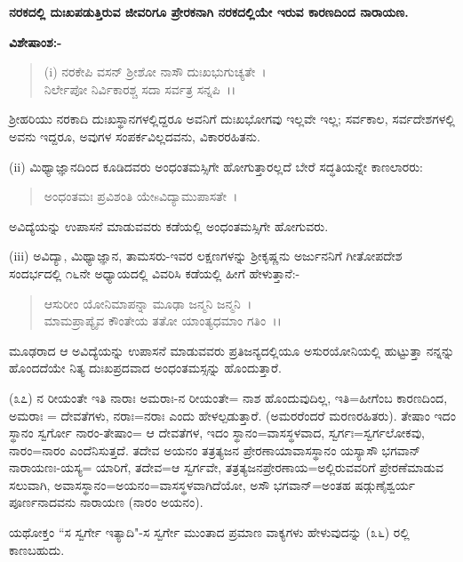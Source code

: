 \begin{center}
\textbf{ನರಕದಲ್ಲಿ ದುಃಖಪಡುತ್ತಿರುವ ಜೀವರಿಗೂ ಪ್ರೇರಕನಾಗಿ ನರಕದಲ್ಲಿಯೇ ಇರುವ ಕಾರಣದಿಂದ ನಾರಾಯಣ.}
\end{center}

\noindent
\textbf{ವಿಶೇಷಾಂಶ:-}

\begin{verse}
(i) ನರಕೇಪಿ ವಸನ್ ಶ‍್ರೀಶೋ ನಾಸೌ ದುಃಖಭುಗುಚ್ಯತೇ~।\\ ನಿರ್ಲೇಪೋ ನಿರ್ವಿಕಾರಶ್ಚ ಸದಾ ಸರ್ವತ್ರ ಸನ್ನಪಿ~।।
\end{verse}


ಶ‍್ರೀಹರಿಯು ನರಕಾದಿ ದುಃಖಸ್ಥಾನಗಳಲ್ಲಿದ್ದರೂ ಅವನಿಗೆ ದುಃಖಭೋಗವು ಇಲ್ಲವೇ ಇಲ್ಲ; ಸರ್ವಕಾಲ, ಸರ್ವದೇಶಗಳಲ್ಲಿ ಅವನು ಇದ್ದರೂ, ಅವುಗಳ ಸಂಪರ್ಕವಿಲ್ಲದವನು, ವಿಕಾರರಹಿತನು.

(ii) ಮಿಥ್ಯಾಜ್ಞಾನದಿಂದ ಕೂಡಿದವರು ಅಂಧಂತಮಸ್ಸಿಗೇ ಹೋಗುತ್ತಾರಲ್ಲದೆ ಬೇರೆ ಸದ್ಧತಿಯನ್ನೇ ಕಾಣಲಾರರು:

\begin{verse}
ಅಂಧಂತಮಃ ಪ್ರವಿಶಂತಿ ಯೇsವಿದ್ಯಾಮುಪಾಸತೇ~।
\end{verse}


ಅವಿದ್ಯೆಯನ್ನು ಉಪಾಸನೆ ಮಾಡುವವರು ಕಡೆಯಲ್ಲಿ ಅಂಧಂತಮಸ್ಸಿಗೇ ಹೋಗುವರು.

(iii) ಅವಿದ್ಯಾ, ಮಿಥ್ಯಾಜ್ಞಾನ, ತಾಮಸರು-ಇವರ ಲಕ್ಷಣಗಳನ್ನು ಶ‍್ರೀಕೃಷ್ಣನು ಅರ್ಜುನನಿಗೆ ಗೀತೋಪದೇಶ ಸಂದರ್ಭದಲ್ಲಿ ೧೬ನೇ ಅಧ್ಯಾಯದಲ್ಲಿ ವಿವರಿಸಿ ಕಡೆಯಲ್ಲಿ ಹೀಗೆ ಹೇಳುತ್ತಾನೆ:-

\begin{verse}
ಆಸುರೀಂ ಯೋನಿಮಾಪನ್ನಾ ಮೂಢಾ ಜನ್ಮನಿ ಜನ್ಮನಿ~।\\ ಮಾಮಪ್ರಾಪ್ಯೈವ ಕೌಂತೇಯ ತತೋ ಯಾಂತ್ಯಧಮಾಂ ಗತಿಂ~।।
\end{verse}

\noindent
ಮೂಢರಾದ ಆ ಅವಿದ್ಯೆಯನ್ನು ಉಪಾಸನೆ ಮಾಡುವವರು ಪ್ರತಿಜನ್ಯದಲ್ಲಿಯೂ ಅಸುರಯೋನಿಯಲ್ಲಿ ಹುಟ್ಟುತ್ತಾ ನನ್ನನ್ನು ಹೊಂದದೆಯೇ ನಿತ್ಯ ದುಃಖಪ್ರದವಾದ ಅಂಧಂತಮಸ್ಸನ್ನು ಹೊಂದುತ್ತಾರೆ.

(೩೭) ನ ರೀಯಂತೇ ಇತಿ ನಾರಾಃ ಅಮರಾಃ-ನ ರೀಯಂತೇ= ನಾಶ ಹೊಂದುವುದಿಲ್ಲ, ಇತಿ=ಹೀಗೆಂಬ ಕಾರಣದಿಂದ, ಅಮರಾಃ = ದೇವತೆಗಳು, ನರಾಃ=ನರಾಃ ಎಂದು ಹೇಳಲ್ಪಡುತ್ತಾರೆ. (ಅಮರರೆಂದರೆ ಮರಣರಹಿತರು). ತೇಷಾಂ ಇದಂ ಸ್ಥಾನಂ ಸ್ವರ್ಗೋ ನಾರಂ-ತೇಷಾಂ= ಆ ದೇವತೆಗಳ, ಇದಂ ಸ್ಥಾನಂ=ವಾಸಸ್ಥಳವಾದ, ಸ್ವರ್ಗಃ=ಸ್ವರ್ಗಲೋಕವು, ನಾರಂ=ನಾರಂ ಎಂದೆನಿಸುತ್ತದೆ. ತದೇವ ಅಯನಂ ತತ್ರತ್ಯಜನ ಪ್ರೇರಣಾಯಾವಾಸಸ್ಥಾನಂ ಯಸ್ಯಾಸೌ ಭಗವಾನ್ ನಾರಾಯಣಃ-ಯಸ್ಯ= ಯಾರಿಗೆ, ತದೇವ=ಆ ಸ್ವರ್ಗವೇ, ತತ್ರತ್ಯಜನಪ್ರೇರಣಾಯ=ಅಲ್ಲಿರುವವರಿಗೆ ಪ್ರೇರಣೆಮಾಡುವ ಸಲುವಾಗಿ, ಅವಾಸಸ್ಥಾನಂ=ಅಯನಂ=ವಾಸಸ್ಥಳವಾಗಿದೆಯೋ, ಅಸೌ ಭಗವಾನ್=ಅಂತಹ ಷಡ್ಗುಣೈಶ್ವರ್ಯ ಪೂರ್ಣನಾದವನು ನಾರಾಯಣ (ನಾರಂ ಅಯನಂ).

ಯಥೋಕ್ತಂ ``ಸ ಸ್ವರ್ಗೇ ಇತ್ಯಾದಿ"-ಸ ಸ್ವರ್ಗೇ ಮುಂತಾದ ಪ್ರಮಾಣ ವಾಕ್ಯಗಳು ಹೇಳುವುದನ್ನು (೩೬) ರಲ್ಲಿ ಕಾಣಬಹುದು.

